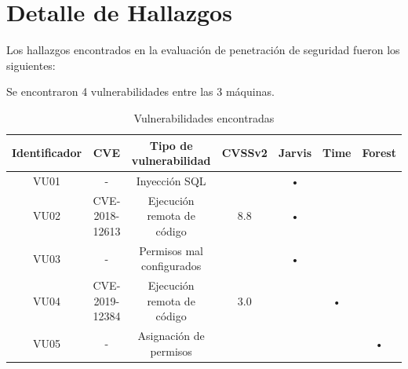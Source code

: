 \documentclass[a4paper]{article}
\begin{document}
    \section{Detalle de Hallazgos}
        \large{Los hallazgos encontrados en la evaluación de penetración de seguridad fueron los siguientes:}
        \par
        \large{Se encontraron 4 vulnerabilidades entre las 3 máquinas.}
        \par
        \begin{table}[H]
            \centering
                \begin{tabular}{|c|c|c|c|c|c|c|}\hline
                    Identificador & CVE & Tipo de vulnerabilidad & CVSSv2 & Jarvis & Time & Forest \\ \hline
                    VU01 & - & Inyección SQL & & • & &  \\ \hline
                    VU02 & CVE-2018-12613 & Ejecución remota de código & 8.8 & • & &  \\ \hline
                    VU03 & - & Permisos mal configurados & & • & &  \\ \hline
                    VU04 & CVE-2019-12384 & Ejecución remota de código & 3.0 & & • &  \\ \hline
                    VU05 & - & Asignación de permisos & & & & • \\ \hline
                \end{tabular}
                \caption{Vulnerabilidades encontradas}
        \end{table}
        \par
        

    \clearpage
    
    
    
    \clearpage
\end{document}

